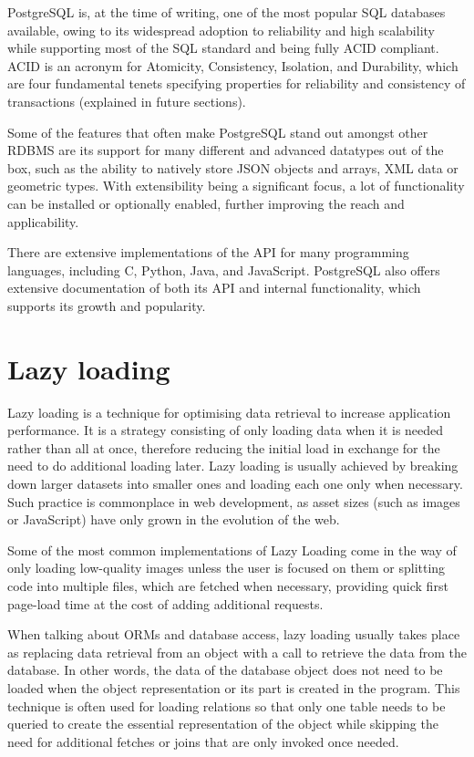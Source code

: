 PostgreSQL is, at the time of writing, one of the most popular SQL databases
available, owing to its widespread adoption to reliability and high scalability
while supporting most of the SQL standard and being fully ACID compliant. ACID
is an acronym for Atomicity, Consistency, Isolation, and Durability, which are
four fundamental tenets specifying properties for reliability and consistency of
transactions (explained in future sections).

Some of the features that often make PostgreSQL stand out amongst other RDBMS
are its support for many different and advanced datatypes out of the box, such
as the ability to natively store JSON objects and arrays, XML data or geometric
types. With extensibility being a significant focus, a lot of functionality can
be installed or optionally enabled, further improving the reach and
applicability.

There are extensive implementations of the API for many programming languages,
including C, Python, Java, and JavaScript. PostgreSQL also offers extensive
documentation of both its API and internal functionality, which supports its
growth and popularity.

\section{Lazy loading}
Lazy loading is a technique for optimising data retrieval to increase
application performance. It is a strategy consisting of only loading data when
it is needed rather than all at once, therefore reducing the initial load in
exchange for the need to do additional loading later. Lazy loading is usually
achieved by breaking down larger datasets into smaller ones and loading each one
only when necessary. Such practice is commonplace in web development, as asset
sizes (such as images or JavaScript) have only grown in the evolution of the
web.

Some of the most common implementations of Lazy Loading come in the way of only
loading low-quality images unless the user is focused on them or splitting code
into multiple files, which are fetched when necessary, providing quick first
page-load time at the cost of adding additional requests.

When talking about ORMs and database access, lazy loading usually takes place as
replacing data retrieval from an object with a call to retrieve the data from
the database. In other words, the data of the database object does not need to
be loaded when the object representation or its part is created in the program.
This technique is often used for loading relations so that only one table needs
to be queried to create the essential representation of the object while
skipping the need for additional fetches or joins that are only invoked once
needed.

